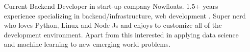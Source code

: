 

\begin{cvparagraph}

Current Backend Developer in start-up company Nowfloats. 1.5+ years experience specializing in backend/infrastructure, web development . Super nerd who loves Python, Linux and Node Js and enjoys to customize all of the development environment. Apart from this interested in applying data science and machine learning to new emerging world problems. 
\end{cvparagraph}

